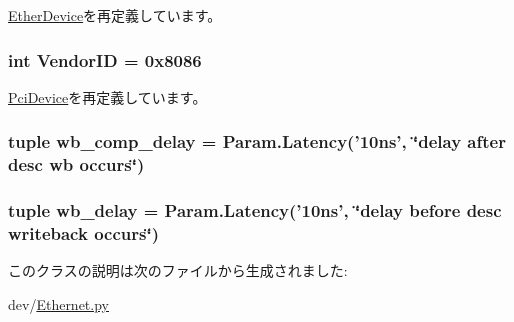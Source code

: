 \hyperlink{classEthernet_1_1EtherDevice_acce15679d830831b0bbe8ebc2a60b2ca}{EtherDevice}を再定義しています。\hypertarget{classEthernet_1_1IGbE_a96ec1b4422f12f72160a0633ada47217}{
\subsubsection[{VendorID}]{\setlength{\rightskip}{0pt plus 5cm}int {\bf VendorID} = 0x8086}}
\label{classEthernet_1_1IGbE_a96ec1b4422f12f72160a0633ada47217}


\hyperlink{classPci_1_1PciDevice_a48f611c5f9d4755971b7c867e4529cc6}{PciDevice}を再定義しています。\hypertarget{classEthernet_1_1IGbE_a7c65838a08d5f401aa8fee9d8882f3ee}{
\subsubsection[{wb\_\-comp\_\-delay}]{\setlength{\rightskip}{0pt plus 5cm}tuple {\bf wb\_\-comp\_\-delay} = Param.Latency('10ns', \char`\"{}delay after desc wb occurs\char`\"{})}}
\label{classEthernet_1_1IGbE_a7c65838a08d5f401aa8fee9d8882f3ee}
\hypertarget{classEthernet_1_1IGbE_aaa18161ae18e293a1d71dfacac7e74d6}{
\subsubsection[{wb\_\-delay}]{\setlength{\rightskip}{0pt plus 5cm}tuple {\bf wb\_\-delay} = Param.Latency('10ns', \char`\"{}delay before desc writeback occurs\char`\"{})}}
\label{classEthernet_1_1IGbE_aaa18161ae18e293a1d71dfacac7e74d6}


このクラスの説明は次のファイルから生成されました:\begin{DoxyCompactItemize}
\item 
dev/\hyperlink{Ethernet_8py}{Ethernet.py}\end{DoxyCompactItemize}
